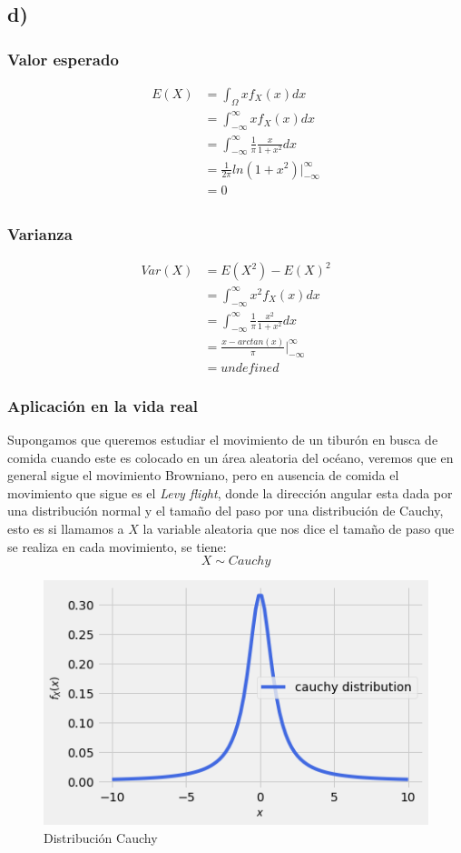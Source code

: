 \documentclass{article}
\begin{document}
\begin{tcolorbox}[breakable]
    \subsection*{d)}
    \subsubsection*{Valor esperado}
    \begin{align*}
        E(X) 
        &= \int_\Omega xf_X(x)dx \\
        &= \int_{-\infty}^\infty xf_X(x)dx \\
        &= \int_{-\infty}^\infty \frac{1}{\pi}\frac{x}{1+x^2}dx \\ 
        &= \frac{1}{2\pi}ln(1+x^2)\bigg|_{-\infty}^\infty \\
        &= 0 \\
    \end{align*}
    \subsubsection*{Varianza}
    \begin{align*}
        Var(X)&= E(X^2)-E(X)^2 \\
        &= \int_{-\infty}^\infty x^2f_X(x)dx \\
        &= \int_{-\infty}^\infty \frac{1}{\pi}\frac{x^2}{1+x^2}dx \\
        &= \frac{x-arctan(x)}{\pi} \bigg|_{-\infty}^\infty \\
        &= undefined
    \end{align*}
    \subsubsection*{Aplicación en la vida real}
    Supongamos que queremos estudiar el movimiento de un tiburón en busca de comida
    cuando este es colocado en un área aleatoria del océano, veremos que en general sigue el 
    movimiento Browniano, pero en ausencia de comida el movimiento que sigue es el \textit{Levy flight}, 
    donde la dirección angular esta dada por una distribución normal y el tamaño del paso por una distribución de Cauchy,
    esto es si llamamos a $X$ la variable aleatoria que nos dice el tamaño de paso que se realiza en cada movimiento, se tiene:
    \[X \sim Cauchy \]
    \begin{figure}[H]
        \centering
        \includegraphics[scale=0.7]{images/p7_cauchy.png}
        \caption{Distribución Cauchy}
    \end{figure}

\end{tcolorbox}
\end{document}
